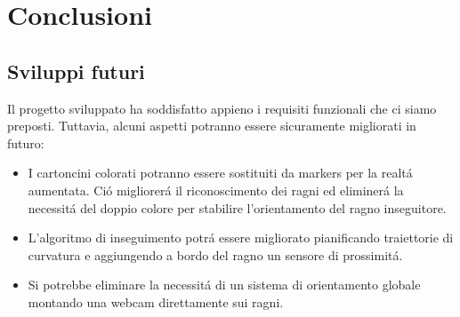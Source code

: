 \documentclass [11pt ,a4paper ,twoside ]{article}
\begin{document}


\section{Conclusioni}

\subsection{Sviluppi futuri}
Il progetto sviluppato ha soddisfatto appieno i requisiti funzionali che ci siamo preposti. Tuttavia, alcuni aspetti potranno essere sicuramente migliorati in futuro:
\begin{itemize}
\item I cartoncini colorati potranno essere sostituiti da markers per la realt\'a aumentata. Ci\'o migliorer\'a il riconoscimento dei ragni ed eliminer\'a la necessit\'a del doppio colore per stabilire l'orientamento del ragno inseguitore. 
\item L'algoritmo di inseguimento potr\'a essere migliorato pianificando traiettorie di curvatura e aggiungendo a bordo del ragno un sensore di prossimit\'a.
\item Si potrebbe eliminare la necessit\'a di un sistema di orientamento globale montando una webcam direttamente sui ragni.
\end{itemize}
\end{document}
